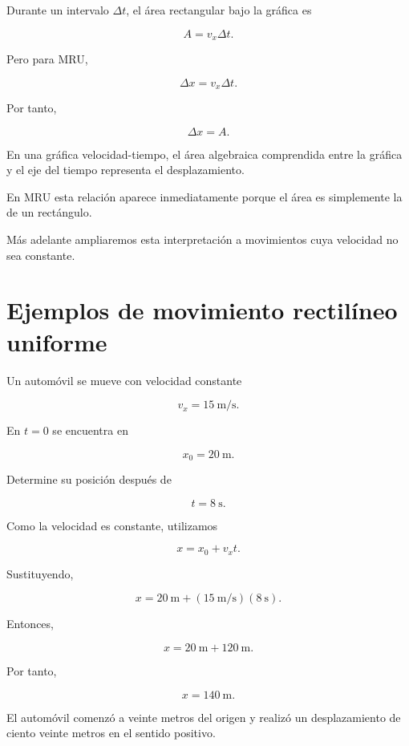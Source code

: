 Durante un intervalo \(\Delta t\), el área rectangular bajo la gráfica es

\[
A=v_x\Delta t.
\]

Pero para MRU,

\[
\Delta x=v_x\Delta t.
\]

Por tanto,

\[ \boxed{\Delta x=A}. \]

\begin{interpretacion}
En una gráfica velocidad-tiempo, el área algebraica comprendida entre la
gráfica y el eje del tiempo representa el desplazamiento.

En MRU esta relación aparece inmediatamente porque el área es simplemente la
de un rectángulo.
\end{interpretacion}

\begin{nota}
Más adelante ampliaremos esta interpretación a movimientos cuya velocidad
no sea constante.
\end{nota}


\section{Ejemplos de movimiento rectilíneo uniforme}

\begin{ejemplo}

Un automóvil se mueve con velocidad constante

\[ v_x=\SI{15}{\meter\per\second}. \]

En \(t=0\) se encuentra en

\[ x_0=\SI{20}{\meter}. \]

Determine su posición después de

\[ t=\SI{8}{\second}. \]

Como la velocidad es constante, utilizamos

\[ x=x_0+v_xt. \]

Sustituyendo,

\[
x
=
\SI{20}{\meter}
+
\left(\SI{15}{\meter\per\second}\right)
\left(\SI{8}{\second}\right).
\]

Entonces,

\[
x
=
\SI{20}{\meter}
+
\SI{120}{\meter}.
\]

Por tanto,

\[ \boxed{x=\SI{140}{\meter}}. \]

\begin{interpretacion}
El automóvil comenzó a veinte metros del origen y realizó un desplazamiento
de ciento veinte metros en el sentido positivo.
\end{interpretacion}
\end{ejemplo}


